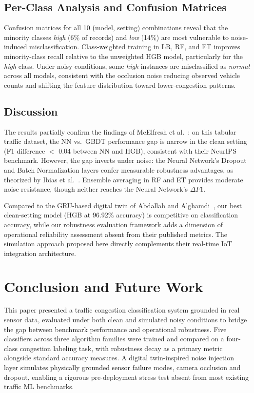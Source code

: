 \documentclass[conference,onecolumn,12pt]{IEEEtran}
\begin{document}
\subsection{Per-Class Analysis and Confusion Matrices}

Confusion matrices for all 10 (model, setting) combinations reveal that the
minority classes \emph{high} (6\% of records) and \emph{low} (14\%) are most
vulnerable to noise-induced misclassification. Class-weighted training in LR,
RF, and ET improves minority-class recall relative to the unweighted HGB
model, particularly for the \emph{high} class. Under noisy conditions, some
\emph{high} instances are misclassified as \emph{normal} across all models,
consistent with the occlusion noise reducing observed vehicle counts and
shifting the feature distribution toward lower-congestion patterns.

\subsection{Discussion}

The results partially confirm the findings of McElfresh et
al.~\cite{mcelfresh2023}: on this tabular traffic dataset, the NN vs.\ GBDT
performance gap is narrow in the clean setting (F1 difference $<$ 0.04
between NN and HGB), consistent with their NeurIPS benchmark. However, the
gap inverts under noise: the Neural Network's Dropout and Batch Normalization
layers confer measurable robustness advantages, as theorized by Ibias et
al.~\cite{ibias2024}. Ensemble averaging in RF and ET provides moderate noise
resistance, though neither reaches the Neural Network's $\Delta F1$.

Compared to the GRU-based digital twin of Abdallah and
Alghamdi~\cite{abdallah2026}, our best clean-setting model (HGB at 96.92\%
accuracy) is competitive on classification accuracy, while our robustness
evaluation framework adds a dimension of operational reliability assessment
absent from their published metrics. The simulation approach proposed here
directly complements their real-time IoT integration architecture.

\section{Conclusion and Future Work}
\label{sec:conclusion}

This paper presented a traffic congestion classification system grounded in
real sensor data, evaluated under both clean and simulated noisy conditions to
bridge the gap between benchmark performance and operational robustness. Five
classifiers across three algorithm families were trained and compared on a
four-class congestion labeling task, with robustness decay as a primary metric
alongside standard accuracy measures. A digital twin-inspired noise injection
layer simulates physically grounded sensor failure modes, camera occlusion and
dropout, enabling a rigorous pre-deployment stress test absent from most
existing traffic ML benchmarks.
\end{document}
